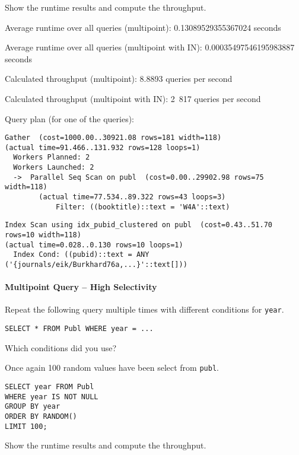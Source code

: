 \documentclass[11pt]{scrartcl}
\begin{document}
Show the runtime results and compute the throughput.

Average runtime over all queries (multipoint): 0.13089529355367024 seconds

Average runtime over all queries (multipoint with IN): 0.00035497546195983887 seconds

Calculated throughput (multipoint): 8.8893 queries per second

Calculated throughput (multipoint with IN): 2 817 queries per second

Query plan (for one of the queries):

{\small
\parskip0pt\begin{verbatim}
Gather  (cost=1000.00..30921.08 rows=181 width=118) 
(actual time=91.466..131.932 rows=128 loops=1)
  Workers Planned: 2
  Workers Launched: 2
  ->  Parallel Seq Scan on publ  (cost=0.00..29902.98 rows=75 width=118) 
        (actual time=77.534..89.322 rows=43 loops=3)
            Filter: ((booktitle)::text = 'W4A'::text)
\end{verbatim}}

{\small
\parskip0pt\begin{verbatim}
Index Scan using idx_pubid_clustered on publ  (cost=0.43..51.70 rows=10 width=118) 
(actual time=0.028..0.130 rows=10 loops=1)
  Index Cond: ((pubid)::text = ANY ('{journals/eik/Burkhard76a,...}'::text[]))
\end{verbatim}}

\paragraph{Multipoint Query -- High Selectivity}

Repeat the following query multiple times with different conditions for \texttt{year}.

\begin{lstlisting}[style=dbtsql]
SELECT * FROM Publ WHERE year = ...
\end{lstlisting}

Which conditions did you use?

Once again 100 random values have been select from \texttt{publ}.

\begin{lstlisting}[style=dbtsql]
SELECT year FROM Publ
WHERE year IS NOT NULL 
GROUP BY year
ORDER BY RANDOM() 
LIMIT 100;
\end{lstlisting}

Show the runtime results and compute the throughput.
\end{document}
